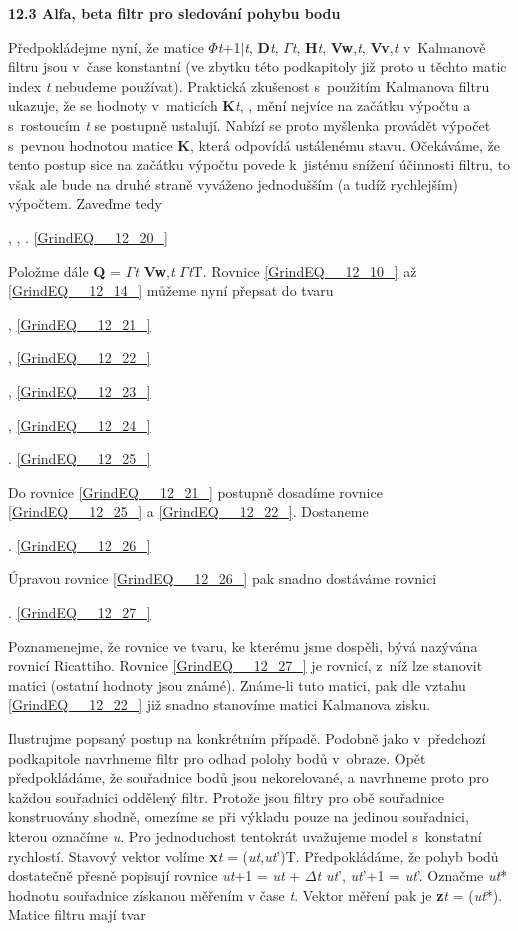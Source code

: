 \noindent \textbf{12.3 Alfa, beta filtr pro sledování pohybu bodu}

\noindent Předpokládejme nyní, že matice \textbf{$\Phi$}\textit{t}+1$\mid$\textit{t}, \textbf{D}\textit{t}, \textbf{$\Gamma$}\textit{t}, \textbf{H}\textit{t}, \textbf{Vw},\textit{t}, \textbf{Vv},\textit{t} v~Kalmanově filtru jsou v~čase konstantní (ve zbytku této podkapitoly již proto u těchto matic index \textit{t} nebudeme používat). Praktická zkušenost s~použitím Kalmanova filtru ukazuje, že se hodnoty v~maticích \textbf{K}\textit{t}, , mění nejvíce na začátku výpočtu a s~rostoucím \textit{t} se postupně ustalují. Nabízí se proto myšlenka provádět výpočet s~pevnou hodnotou matice \textbf{K}, která odpovídá ustálenému stavu. Očekáváme, že tento postup sice na začátku výpočtu povede k~jistému snížení účinnosti filtru, to však ale bude na druhé straně vyváženo jednodušším (a tudíž rychlejším) výpočtem. Zaveďme tedy

 ,     ,     . \eqref{GrindEQ__12_20_}

\noindent Položme dále \textbf{Q} = \textbf{$\Gamma$}\textit{t}\textbf{ Vw},\textit{t} \textbf{$\Gamma$}\textit{t}T. Rovnice \eqref{GrindEQ__12_10_} až \eqref{GrindEQ__12_14_} můžeme nyní přepsat do tvaru

 , \eqref{GrindEQ__12_21_}

 , \eqref{GrindEQ__12_22_}

 , \eqref{GrindEQ__12_23_}

 , \eqref{GrindEQ__12_24_}

 . \eqref{GrindEQ__12_25_}

\noindent Do rovnice \eqref{GrindEQ__12_21_} postupně dosadíme rovnice \eqref{GrindEQ__12_25_} a \eqref{GrindEQ__12_22_}. Dostaneme

 . \eqref{GrindEQ__12_26_}

\noindent Úpravou rovnice \eqref{GrindEQ__12_26_} pak snadno dostáváme rovnici

 . \eqref{GrindEQ__12_27_}

\noindent Poznamenejme, že rovnice ve tvaru, ke kterému jsme dospěli, bývá nazývána rovnicí Ricattiho. Rovnice \eqref{GrindEQ__12_27_} je rovnicí, z~níž lze stanovit matici (ostatní hodnoty jsou známé). Známe-li tuto matici, pak dle vztahu \eqref{GrindEQ__12_22_} již snadno stanovíme matici Kalmanova zisku.

\noindent 

\noindent Ilustrujme popsaný postup na konkrétním případě. Podobně jako v~předchozí podkapitole navrhneme filtr pro odhad polohy bodů v~obraze. Opět předpokládáme, že souřadnice bodů jsou nekorelované, a navrhneme proto pro každou souřadnici oddělený filtr. Protože jsou filtry pro obě souřadnice konstruovány shodně, omezíme se při výkladu pouze na jedinou souřadnici, kterou označíme \textit{u}. Pro jednoduchost tentokrát uvažujeme model s~konstatní rychlostí. Stavový vektor volíme \textbf{x}\textit{t} = (\textit{ut},\textit{ut}')T. Předpokládáme, že pohyb bodů dostatečně přesně popisují rovnice \textit{ut}+1 = \textit{ut} + $\Delta$\textit{t} \textit{ut}', \textit{ut}'+1 = \textit{ut}'. Označme \textit{ut}* hodnotu souřadnice získanou měřením v čase \textit{t}. Vektor měření pak je \textbf{z}\textit{t} = (\textit{ut}*). Matice filtru mají tvar

